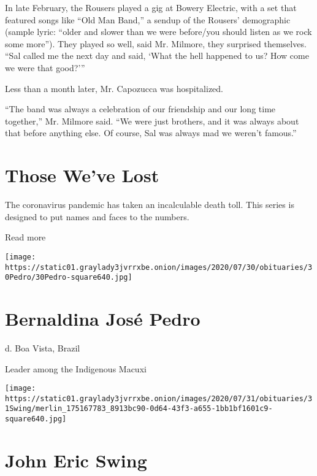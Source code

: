In late February, the Rousers played a gig at Bowery Electric, with a
set that featured songs like ``Old Man Band,'' a sendup of the Rousers'
demographic (sample lyric: ``older and slower than we were before/you
should listen as we rock some more''). They played so well, said Mr.
Milmore, they surprised themselves. ``Sal called me the next day and
said, `What the hell happened to us? How come we were that good?'''

Less than a month later, Mr. Capozucca was hospitalized.

``The band was always a celebration of our friendship and our long time
together,'' Mr. Milmore said. ``We were just brothers, and it was always
about that before anything else. Of course, Sal was always mad we
weren't famous.''

\href{https://www.nytimes3xbfgragh.onion/interactive/2020/obituaries/people-died-coronavirus-obituaries.html?action=click\&pgtype=Article\&state=default\&region=BELOW_MAIN_CONTENT\&context=covid_obits_promo}{}

\hypertarget{those-weve-lost}{%
\section{Those We've Lost}\label{those-weve-lost}}

The coronavirus pandemic has taken an incalculable death toll. This
series is designed to put names and faces to the numbers.

Read more

\texttt{[image: https://static01.graylady3jvrrxbe.onion/images/2020/07/30/obituaries/30Pedro/30Pedro-square640.jpg]}

\hypertarget{bernaldina-josuxe9-pedro}{%
\section{Bernaldina José Pedro}\label{bernaldina-josuxe9-pedro}}

d. Boa Vista, Brazil

Leader among the Indigenous Macuxi

\texttt{[image: https://static01.graylady3jvrrxbe.onion/images/2020/07/31/obituaries/31Swing/merlin\_175167783\_8913bc90-0d64-43f3-a655-1bb1bf1601c9-square640.jpg]}

\hypertarget{john-eric-swing}{%
\section{John Eric Swing}\label{john-eric-swing}}

